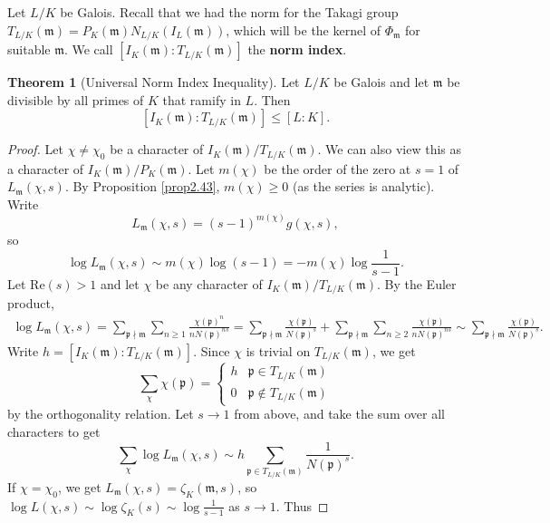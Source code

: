 \documentclass{article}
\theoremstyle{definition}
\newtheorem{theorem}{Theorem}[section]
\begin{document}
Let $L/K$ be Galois. Recall that we had the norm for the Takagi group $T_{L/K}(\mathfrak{m})=P_K(\mathfrak{m})N_{L/K}(I_L(\mathfrak{m}))$, which will be the kernel of $\Phi_{\mathfrak{m}}$ for suitable $\mathfrak{m}$. We call $[I_K(\mathfrak{m}) : T_{L/K}(\mathfrak{m})]$ the \textbf{norm index}.
\begin{theorem}[Universal Norm Index Inequality]\label{theorem2.45}
    Let $L/K$ be Galois and let $\mathfrak{m}$ be divisible by all primes of $K$ that ramify in $L$. Then \[
    [I_K(\mathfrak{m}): T_{L/K}(\mathfrak{m})] \le [L:K].
    \]
\end{theorem}
\begin{proof}
    Let $\chi \neq \chi_0$ be a character of $I_K(\mathfrak{m})/T_{L/K}(\mathfrak{m})$. We can also view this as a character of $I_K(\mathfrak{m})/P_K(\mathfrak{m})$. Let $m(\chi)$ be the order of the zero at $s=1$ of $L_{\mathfrak{m}}(\chi,s)$. By Proposition \ref{prop2.43}, $m(\chi)\ge 0$ (as the series is analytic). Write \[
    L_{\mathfrak{m}}(\chi,s) = (s-1)^{m(\chi)}g(\chi,s),
    \]
    so \[
    \log L_{\mathfrak{m}}(\chi,s) \sim m(\chi) \log(s-1) = -m(\chi) \log \frac{1}{s-1}.
    \]
    Let $\text{Re}(s)>1$ and let $\chi$ be any character of $I_K(\mathfrak{m})/T_{L/K}(\mathfrak{m})$. By the Euler product, 
    \begin{align*}
        \log L_{\mathfrak{m}}(\chi,s) = \sum_{\mathfrak{p} \nmid \mathfrak{m}}^{} \sum_{n\ge 1}^{} \frac{\chi(\mathfrak{p})^{n}}{n N(\mathfrak{p})^{ns}} = \sum_{\mathfrak{p} \nmid \mathfrak{m}}^{} \frac{\chi(\mathfrak{p})}{N(\mathfrak{p})^s} + \sum_{\mathfrak{p} \nmid \mathfrak{m}}^{} \sum_{n\ge 2}^{} \frac{\chi(\mathfrak{p})}{n N(\mathfrak{p})^{ns}} \sim \sum_{\mathfrak{p} \nmid \mathfrak{m}}^{} \frac{\chi(\mathfrak{p})}{N(\mathfrak{p})^s}.
    \end{align*}
    Write $h = [I_K(\mathfrak{m}): T_{L/K}(\mathfrak{m})]$. Since $\chi$ is trivial on $T_{L/K}(\mathfrak{m})$, we get \[
    \sum_{\chi}^{} \chi(\mathfrak{p}) = \begin{cases}
        h & \mathfrak{p} \in T_{L/K}(\mathfrak{m})\\
        0 & \mathfrak{p} \not\in T_{L/K}(\mathfrak{m})
    \end{cases}
    \]
    by the orthogonality relation. Let $s \to 1$ from above, and take the sum over all characters to get 
    \[
    \sum_{\chi}^{} \log L_{\mathfrak{m}}(\chi,s) \sim h \sum_{\mathfrak{p} \in T_{L/K}(\mathfrak{m})}^{} \frac{1}{N(\mathfrak{p})^s}.
    \]
    If $\chi = \chi_0$, we get $L_{\mathfrak{m}}(\chi,s) = \zeta_K(\mathfrak{m},s)$, so $\log L(\chi,s) \sim \log \zeta_K(s) \sim \log\frac{1}{s-1}$ as $s \to 1$. Thus

\end{proof}
\end{document}
